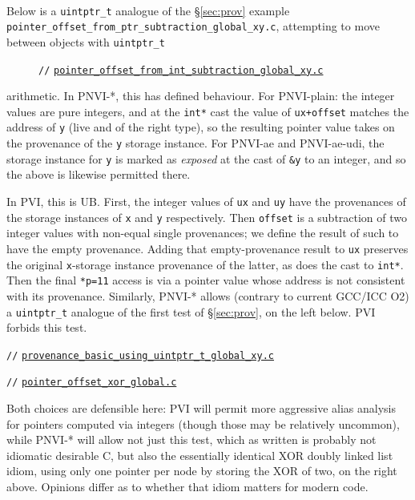 \documentclass[acmsmall,review,screen]{acmart}\settopmatter{printfolios=true,printccs=false,printacmref=false}
\newcommand{\myparagraph}[1]{\vspace{0.5\baselineskip}\par\noindent{\normalsize\bfseries{#1}}\quad}
\newcommand{\mytesturl}[1]{https://cerberus.cl.cam.ac.uk/cerberus?defacto/#1}
\newcommand{\mytestlink}[2]{\href{\mytesturl{#1}}{#2}}
\newcommand{\mylsttestlink}[1]{\mytestlink{#1}{\lstinline{#1}}}
\newcommand{\mylistingmargin}{5mm}
\newcommand{\myfooexample}[3]{{\vspace*{-0.5\baselineskip}\par{\noindent\small\hspace*{\mylistingmargin}\lstinline{//} \mylsttestlink{#2}\vspace*{0.25\baselineskip}\par}}}
\begin{document}
\ 

 
\myparagraph{Inter-object integer arithmetic}
Below is a \lstinline{uintptr_t} analogue of the \S\ref{sec:prov} example
\texttt{pointer\_offset\_from\_ptr\_subtraction\_global\_xy.c}, attempting to move between objects
with \lstinline{uintptr_t}
\begin{figure}
{\renewcommand{\mylistingmargin}{0mm}\myfooexample{charon_tests}{pointer_offset_from_int_subtraction_global_xy.c}{}%
}
\vspace*{-2\baselineskip}
\end{figure}
arithmetic.
%
In PNVI-*, this has defined behaviour.  For PNVI-plain: the integer
values are pure integers, and at the \lstinline{int*} cast
the value of \lstinline{ux+offset} matches the address
of \lstinline{y} (live and of the right type), so the
resulting pointer value takes on the provenance of the \lstinline{y}
storage instance.  For PNVI-ae and PNVI-ae-udi, the storage instance for \lstinline{y}
is marked as \emph{exposed} at the cast of \lstinline{&y} to an
integer, and so the above is likewise permitted there. 

In PVI, this is UB. First,
the integer values of \lstinline{ux}
and \lstinline{uy} have the provenances of the storage instances
of \lstinline{x} and \lstinline{y} respectively. Then 
\lstinline{offset} is a subtraction of two integer values with
non-equal single provenances; we define the result of such to have the
empty provenance.  Adding that empty-provenance result
to \lstinline{ux} preserves the original \lstinline{x}-storage instance
provenance of the latter, as does 
the cast to \lstinline{int*}.
Then the final \lstinline{*p=11} access is via a pointer value whose
address is not consistent with its provenance.
%
%
Similarly, PNVI-* allows
(contrary to current GCC/ICC O2) a \lstinline{uintptr_t} analogue of the
first test of \S\ref{sec:prov}, on the left below.
PVI forbids this test.



\begin{center}
  \begin{minipage}[t]{0.49\textwidth}
{\renewcommand{\mylistingmargin}{0mm}\myfooexample{charon_tests}{provenance_basic_using_uintptr_t_global_xy.c}{}%
}
\vspace*{-0\baselineskip}
\end{minipage}
  \begin{minipage}[t]{0.49\textwidth}
    {\renewcommand{\mylistingmargin}{0mm}\myfooexample{charon_tests}{pointer_offset_xor_global.c}{}%
}
  \end{minipage}
  \end{center}
Both choices are defensible here: PVI will permit more aggressive
alias analysis for pointers computed via integers (though those may be
relatively uncommon), while PNVI-* will
allow not just this test, which as written is probably not idiomatic
desirable C, but also the essentially identical XOR doubly linked list
idiom, using only one pointer per
node by storing the XOR of two, on the right above.  Opinions differ as to
whether that idiom matters for modern code. 
\end{document}
